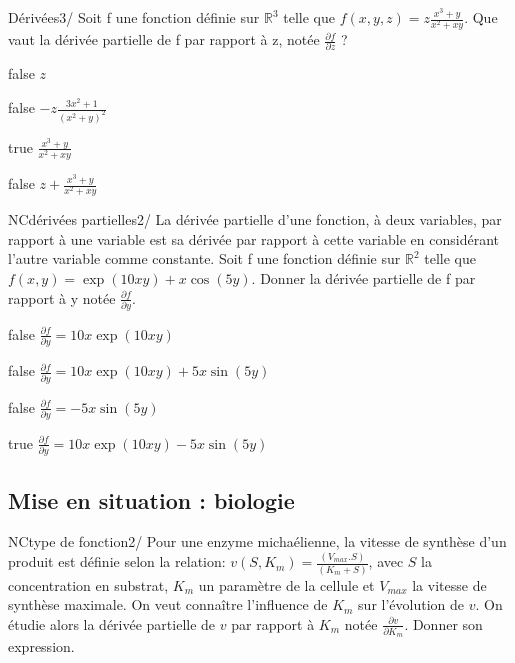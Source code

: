 \documentclass[11pt]{article}
\begin{document}
        \begin{question}{22}{Dérivées}{3}{/}
               Soit f une fonction définie sur $\mathbb{R}^{3}$ telle que $f(x,y,z) = z\frac{x^{3}+y}{x^{2}+xy}$. Que vaut la dérivée partielle de f par rapport à z, notée $\frac{\partial f}{\partial z}$ ?
        \end{question}
        \begin{reponses}
        	\item[false]  $z$
        	\item[false]  $-z\frac{3x^{2}+1}{(x^{2}+y)^2}$
            \item[true]  $\frac{x^{3}+y}{x^{2}+xy}$
            \item[false]  $z+\frac{x^{3}+y}{x^{2}+xy}$
        \end{reponses}
        
        
        
            
            \begin{question}{NC}{dérivées partielles}{2}{/} 
            La dérivée partielle d'une fonction, à deux variables, par rapport à une variable est sa dérivée par rapport à cette variable en considérant l'autre variable comme constante. Soit f une fonction définie sur $\mathbb{R}^{2}$ telle que $f(x,y) = \exp(10xy)+x\cos(5y)$. Donner la dérivée partielle de f par rapport à y notée $\frac{\partial f}{\partial y}$.  
            \end{question}

            \begin{reponses}
            	\item[false]  $\frac{\partial f}{\partial y} = 10x\exp(10xy)$
            	\item[false]  $\frac{\partial f}{\partial y} =10x\exp(10xy)+5x\sin(5y)$
                \item[false]  $\frac{\partial f}{\partial y} =-5x\sin(5y)$
                \item[true]   $\frac{\partial f}{\partial y} =10x\exp(10xy)-5x\sin(5y)$
            \end{reponses}
            
        \subsection{Mise en situation : biologie}
            \begin{question}{NC}{type de fonction}{2}{/} 
				Pour une enzyme michaélienne, la vitesse de synthèse d’un produit est définie selon  la relation: $v(S,K_m) = \frac{(V_{max} . S)}{(K_m+S)}$, avec $S$ la concentration en substrat, $K_m$ un paramètre de la cellule et $V_{max}$ la vitesse de synthèse maximale. On veut connaître l'influence de $K_m$ sur l'évolution de $v$. On étudie alors la dérivée partielle de $v$ par rapport à $K_m$ notée $\frac{\partial v}{\partial K_m}$. Donner son expression. 

            \end{question}
\end{document}
